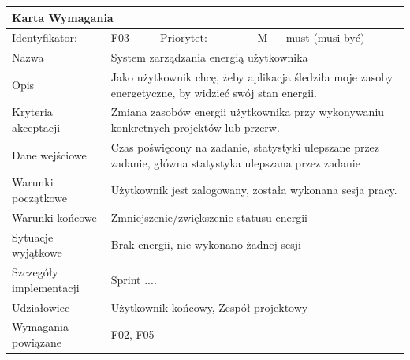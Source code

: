 \documentclass[a4paper,11pt]{report}
\begin{document}
		\begin{tabular}{|p{3cm}|p{2cm}|p{2cm}|p{6cm}|}
		\hline
		\multicolumn{4}{|p{12 cm}|}{Karta Wymagania}\\
		\hline
		Identyfikator: & F03 & Priorytet: & M — must (musi być)\\
		\hline
		Nazwa & \multicolumn{3}{|p{10 cm}|}{System zarządzania energią użytkownika}\\
		\hline
		Opis & \multicolumn{3}{|p{10 cm}|}{Jako użytkownik chcę, żeby aplikacja śledziła moje zasoby energetyczne, by widzieć swój stan energii.}\\
		\hline
		Kryteria akceptacji & \multicolumn{3}{|p{10 cm}|}{Zmiana zasobów energii użytkownika przy wykonywaniu konkretnych projektów lub przerw.}\\
		\hline
		Dane wejściowe & \multicolumn{3}{|p{10 cm}|}{Czas poświęcony na zadanie, statystyki ulepszane przez zadanie, główna statystyka ulepszana przez zadanie}\\
		\hline
		Warunki początkowe & \multicolumn{3}{|p{10 cm}|}{Użytkownik jest zalogowany, została wykonana sesja pracy.}\\
		\hline
		Warunki końcowe & \multicolumn{3}{|p{10 cm}|}{Zmniejszenie/zwiększenie statusu energii}\\
		\hline
		Sytuacje wyjątkowe & \multicolumn{3}{|p{10 cm}|}{Brak energii, nie wykonano żadnej sesji}\\
		\hline
		Szczegóły implementacji & \multicolumn{3}{|p{10 cm}|}{Sprint ....}\\
		\hline
		Udziałowiec & \multicolumn{3}{|p{10 cm}|}{Użytkownik końcowy, Zespół projektowy}\\
		\hline
		Wymagania powiązane & \multicolumn{3}{|p{10 cm}|}{F02, F05}\\
		\hline
		\end{tabular}\\
		\newline
		\vspace*{0,2 cm}
		\newline
\end{document}
